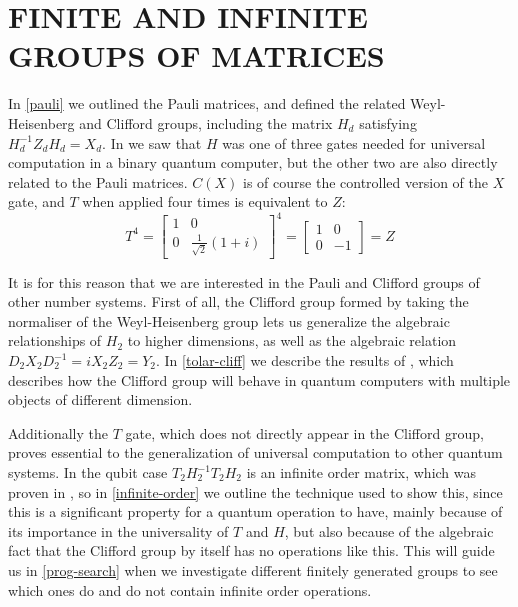 
\chapter[FINITE AND INFINITE GROUPS OF MATRICES]{FINITE AND INFINITE GROUPS OF MATRICES}\label{finite-gen}

In \autoref{pauli} we outlined the Pauli matrices, and defined the related Weyl-Heisenberg and Clifford groups, including the matrix $H_d$ satisfying $H_d^{-1}Z_dH_d = X_d$. In \cite{universal-qubit} we saw that $H$ was one of three gates needed for universal computation in a binary quantum computer, but the other two are also directly related to the Pauli matrices. $C(X)$ is of course the controlled version of the $X$ gate, and $T$ when applied four times is equivalent to $Z$:
\[
T^4 = \left[\begin{matrix}
	1 & 0 \\
	0 & \frac{1}{\sqrt{2}}(1+i)
\end{matrix}\right]^4 = \left[\begin{matrix}
	1 & 0 \\
	0 & -1
\end{matrix}\right] = Z\]

It is for this reason that we are interested in the Pauli and Clifford groups of other number systems. 
First of all, the Clifford group formed by taking the normaliser of the Weyl-Heisenberg group lets us generalize the algebraic relationships of $H_2$ to higher dimensions, as well as the algebraic relation $D_2X_2D_2^{-1} = iX_2Z_2 = Y_2$. In \autoref{tolar-cliff} we describe the results of \cite{tolar-clifford}, which describes how the Clifford group will behave in quantum computers with multiple objects of different dimension.

Additionally the $T$ gate, which does not directly appear in the Clifford group, proves essential to the generalization of universal computation to other quantum systems. In the qubit case $T_2H_2^{-1}T_2H_2$ is an infinite order matrix, which was proven in \cite{universal-qubit}, so in \autoref{infinite-order} we outline the technique used to show this, since this is a significant property for a quantum operation to have, mainly because of its importance in the universality of $T$ and $H$, but also because of the algebraic fact that the Clifford group by itself has no operations like this. This will guide us in \autoref{prog-search} when we investigate different finitely generated groups to see which ones do and do not contain infinite order operations.
